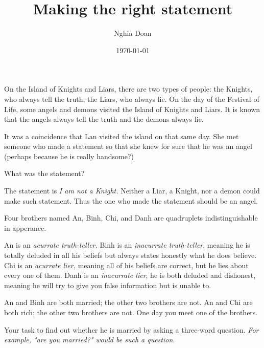 \documentclass{article}
\title{Making the right statement}
\author{Nghia Doan}
\date{\today}
\begin{document}
\maketitle

\begin{example*}

    On the Island of Knights and Liars, there are two types of people:
    the Knights, who always tell the truth, the Liars, who always lie.
    On the day of the Festival of Life, some angels and demons visited the Island of Knights and Liars.
    It is known that the angels always tell the truth and the demons always lie.

    It was a coincidence that Lan visited the island on that same day.
    She met someone who made a statement so that she knew for sure that he was an angel
    (perhaps because he is really handsome?)

    What was the statement?
\end{example*}

\begin{soln}
    The statement is \textit{I am not a Knight.}
    Neither a Liar, a Knight, nor a demon could make such statement.
    Thus the one who made the statement should be an angel.
\end{soln}

\begin{example*}

    Four brothers named An, Binh, Chi, and Danh are quadruplets indistinguishable in apperance.
    \begin{itemize}[topsep=0pt, partopsep=0pt, itemsep=0pt]
        \ii An is an \textit{acurrate truth-teller.}
        \ii Binh is an \textit{inacurrate truth-teller}, meaning
        he is totally deluded in all his beliefs but always states honestly what he does believe.
        \ii Chi is an \textit{acurrate lier,} meaning
        all of his beliefs are correct, but he lies about every one of them.
        \ii Danh is an \textit{inacurrate lier}, he is both deluded and dishonest, meaning
        he will try to give you false information but is unable to.
    \end{itemize} 

    An and Binh are both married; the other two brothers are not.
    An and Chi are both rich; the other two brothers are not. 
    One day you meet one of the brothers. 

    Your task to find out whether he is married by asking a three-word question.
    \textit{For example, "are you married?" would be such a question.}
\end{example*}
\end{document}
